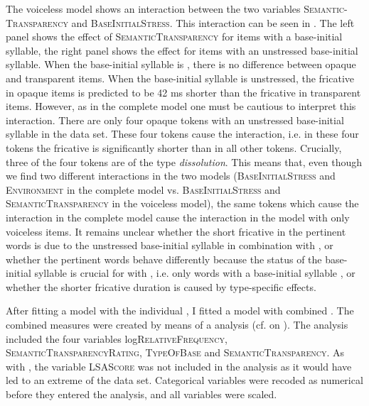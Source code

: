 The voiceless model shows an interaction between the two variables \textsc{Semantic-Transparency} and \textsc{BaseInitialStress}. This interaction can be seen in . The left panel shows the effect of \textsc{SemanticTransparency} for items with a  base-initial syllable, the right panel shows the effect for items with an unstressed base-initial syllable. When the base-initial syllable is , there is no difference between opaque and transparent items. When the base-initial syllable is unstressed, the fricative in opaque items is predicted to be 42 ms shorter than the fricative in transparent items. However, as in the complete model one must be cautious to  interpret this interaction. There are only four opaque tokens with an unstressed base-initial syllable in the data set. These four tokens cause the interaction, i.e. in these four tokens the fricative is significantly shorter than in all other tokens. 
Crucially, three of the four tokens are of the type \textit{dissolution}. This means that, even though we find two different interactions in the two models (\textsc{BaseInitialStress} and \textsc{Environment} in the complete model vs. \textsc{BaseInitialStress} and \textsc{SemanticTransparency} in the voiceless model), the same tokens which cause the interaction in the complete model cause the interaction in the model with only voiceless items. It remains unclear whether the short fricative in the pertinent words is due to the unstressed base-initial syllable in combination with , or whether the pertinent words behave differently because the  status of the base-initial syllable is crucial for  with , i.e. only words with a  base-initial syllable , or whether the shorter fricative duration is caused by type-specific effects. 



After fitting a model with the individual , I fitted a model with combined . The combined measures were created by means of a  analysis (cf.  on ). 
The  analysis included the four variables log\textsc{RelativeFrequency}, \textsc{SemanticTransparencyRating}, \textsc{TypeOfBase} and \textsc{SemanticTransparency}. As with , the variable \textsc{LSAScore} was not included in the  analysis as it would have led to an extreme  of the data set. Categorical variables were recoded as numerical before they entered the analysis, and all variables were scaled.




